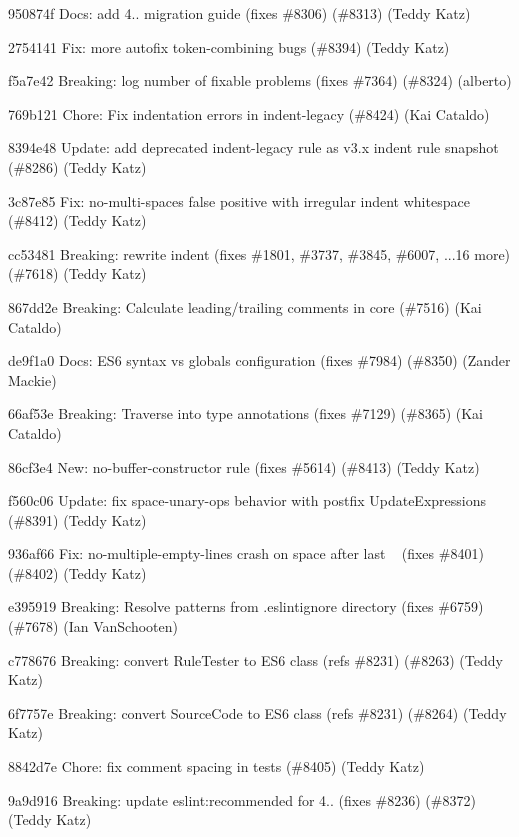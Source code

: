 \begin{DoxyItemize}
\item 950874f Docs\+: add 4.. migration guide (fixes \#8306) (\#8313) (Teddy Katz)
\item 2754141 Fix\+: more autofix token-\/combining bugs (\#8394) (Teddy Katz)
\item f5a7e42 Breaking\+: log number of fixable problems (fixes \#7364) (\#8324) (alberto)
\item 769b121 Chore\+: Fix indentation errors in indent-\/legacy (\#8424) (Kai Cataldo)
\item 8394e48 Update\+: add deprecated indent-\/legacy rule as v3.\+x indent rule snapshot (\#8286) (Teddy Katz)
\item 3c87e85 Fix\+: no-\/multi-\/spaces false positive with irregular indent whitespace (\#8412) (Teddy Katz)
\item cc53481 Breaking\+: rewrite indent (fixes \#1801, \#3737, \#3845, \#6007, ...16 more) (\#7618) (Teddy Katz)
\item 867dd2e Breaking\+: Calculate leading/trailing comments in core (\#7516) (Kai Cataldo)
\item de9f1a0 Docs\+: ES6 syntax vs globals configuration (fixes \#7984) (\#8350) (Zander Mackie)
\item 66af53e Breaking\+: Traverse into type annotations (fixes \#7129) (\#8365) (Kai Cataldo)
\item 86cf3e4 New\+: no-\/buffer-\/constructor rule (fixes \#5614) (\#8413) (Teddy Katz)
\item f560c06 Update\+: fix space-\/unary-\/ops behavior with postfix Update\+Expressions (\#8391) (Teddy Katz)
\item 936af66 Fix\+: no-\/multiple-\/empty-\/lines crash on space after last ~\newline
 (fixes \#8401) (\#8402) (Teddy Katz)
\item e395919 Breaking\+: Resolve patterns from .eslintignore directory (fixes \#6759) (\#7678) (Ian Van\+Schooten)
\item c778676 Breaking\+: convert Rule\+Tester to ES6 class (refs \#8231) (\#8263) (Teddy Katz)
\item 6f7757e Breaking\+: convert Source\+Code to ES6 class (refs \#8231) (\#8264) (Teddy Katz)
\item 8842d7e Chore\+: fix comment spacing in tests (\#8405) (Teddy Katz)
\item 9a9d916 Breaking\+: update eslint\+:recommended for 4.. (fixes \#8236) (\#8372) (Teddy Katz)

\end{DoxyItemize}
